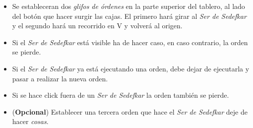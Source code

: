 \documentclass[11pt]{article}
\begin{document}
\begin{itemize}
\item Se estableceran dos \emph{glifos de órdenes} en la parte superior del tablero, al
lado del botón que hacer surgir las cajas. El primero hará girar al \emph{Ser de
Sedefkar} y el segundo hará un recorrido en V y volverá al origen.
\item Si el \emph{Ser de Sedefkar} está visible ha de hacer caso, en caso contrario, la
orden se pierde.
\item Si el \emph{Ser de Sedefkar} ya está ejecutando una orden, debe dejar de
ejecutarla y pasar a realizar la nueva orden.
\item Si se hace click fuera de un \emph{Ser de Sedefkar} la orden también se pierde.
\item (\textbf{Opcional}) Establecer una tercera orden que hace el \emph{Ser de Sedefkar} deje
de hacer \emph{cosas}.
\end{itemize}
\end{document}
